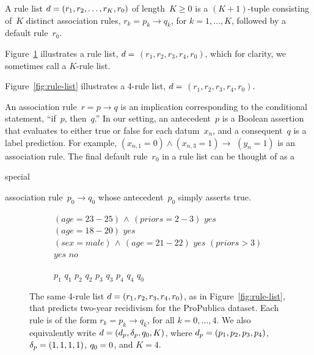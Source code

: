 A rule list ${{d} = (r_1, r_2, \dots, r_K, r_0)}$ of length~${K \ge 0}$
is a ${(K+1)}$-tuple consisting of~$K$ distinct association rules,
${r_k = p_k \rightarrow q_k}$, for ${k = 1, \dots, K}$,
followed by a default rule~$r_0$.
%
\begin{arxiv}
Figure~\ref{fig:rule-list-symbols} illustrates
a rule list, ${{d} =}$ ${(r_1, r_2, r_3, r_4, r_0)}$,
which for clarity, we sometimes call a $K$-rule list.
\end{arxiv}
\begin{kdd}
Figure~\ref{fig:rule-list} illustrates a 4-rule list,
${{d} =}$ ${(r_1, r_2, r_3, r_4, r_0)}$.
\end{kdd}
%
An association rule~${r = p \rightarrow q}$ is an implication
corresponding to the conditional statement, ``if~$p$, then~$q$.''
%
In our setting, an antecedent~$p$ is a Boolean assertion that
evaluates to either true or false for each datum~$x_n$,
and a consequent~$q$ is a label prediction.
%
For example, ${(x_{n, 1} = 0) \wedge (x_{n, 3} = 1) \rightarrow}$ ${(y_n = 1)}$
is an association rule.
%
%
The final default rule~$r_0$ in a rule list can be thought of
as a
\begin{arxiv}
special
\end{arxiv}
association rule~${p_0 \rightarrow q_0}$
whose antecedent~$p_0$ simply asserts true.

\begin{arxiv}
\begin{figure}[t!]
\begin{subfigure}{0.67\textwidth}
\begin{algorithmic}
\State \bif $(age=23-25) \,\wedge\, (priors=2-3)$ \bthen $yes$
\State \belif $(age=18-20)$ \bthen $yes$
\State \belif $(sex=male) \,\wedge\, (age=21-22)$ \bthen $yes$
\State \belif $(priors>3)$ \bthen $yes$
\State \belse $no$
\end{algorithmic}
\end{subfigure}
\hfill
\begin{subfigure}{0.32\textwidth}
\begin{algorithmic}
\State \bif $p_1$ \bthen $q_1$
\State \belif $p_2$ \bthen $q_2$
\State \belif $p_3$ \bthen $q_3$
\State \belif $p_4$ \bthen $q_4$
\State \belse $q_0$
\end{algorithmic}
\end{subfigure}
\caption{The same 4-rule list ${{d} = (r_1, r_2, r_3, r_4, r_0)}$,
as in Figure~\ref{fig:rule-list},
that predicts two-year recidivism for the ProPublica dataset.
Each rule is of the form ${r_k = p_k \rightarrow q_k}$,
for all ${k = 0, \dots, 4}$.
We also equivalently write ${{d} = (d_p, \delta_p, q_0, K)}$,
where ${d_p = (p_1, p_2, p_3, p_4)}$, ${\delta_p = (1, 1, 1, 1)}$,
${q_0 = 0}$, and ${K=4}$.
}
\label{fig:rule-list-symbols}
\end{figure}
\end{arxiv}

